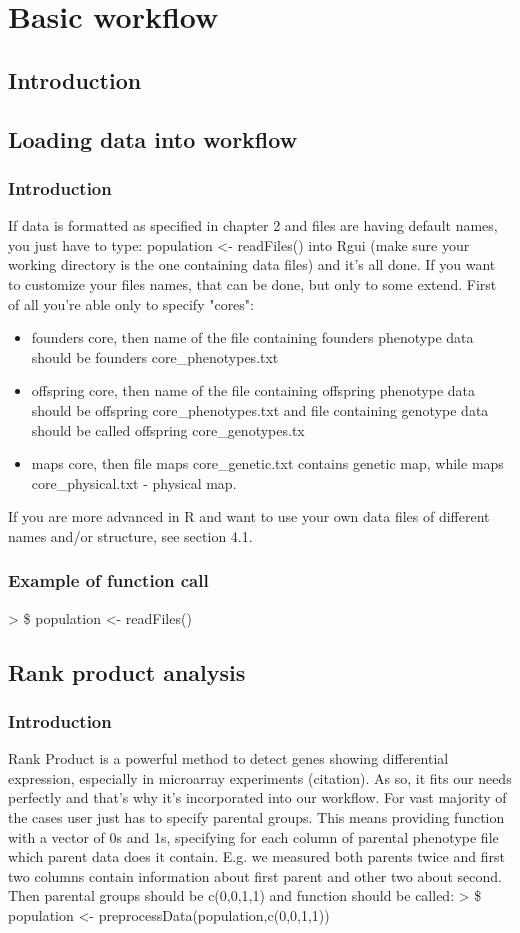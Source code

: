 \documentclass{article}
\begin{document}
\section{Basic workflow}

\subsection{Introduction}
\blindtext[2]


\subsection{Loading data into workflow}
\subsubsection{Introduction}
If data is formatted as specified in chapter 2 and files are having default names, you just have to type: population <-  readFiles() into Rgui (make sure your working directory is the one containing data files) and it's all done. If you want to customize your files names, that can be done, but only to some extend. First of all you're able only to specify "cores": 
\begin{itemize}
\item  founders core, then name of the file containing founders phenotype data should be founders core\_phenotypes.txt
\item  offspring core,  then name of the file containing offspring phenotype data should be offspring core\_phenotypes.txt and file containing genotype data should be called offspring core\_genotypes.tx
\item maps core, then file maps core\_genetic.txt contains genetic map, while maps core\_physical.txt - physical map.
\end{itemize}
If you are more advanced in R and want to use your own data files of different names and/or structure, see section 4.1.
\subsubsection{Example of function call}
> \$ population <- readFiles()
\subsection{Rank product analysis}
\subsubsection{Introduction}
Rank Product is a powerful method to detect genes showing differential expression, especially in microarray experiments (citation). As so, it fits our needs perfectly and that's why it's incorporated into our workflow. For vast majority of the cases user just has to specify parental groups. This means providing function with a vector of 0s and 1s, specifying for each column of parental phenotype file which parent data does it contain. E.g. we measured both parents twice and first two columns contain information about first parent and other two about second. Then parental groups should be c(0,0,1,1) and function should be called: >  \$ population <- preprocessData(population,c(0,0,1,1))
\end{document}
